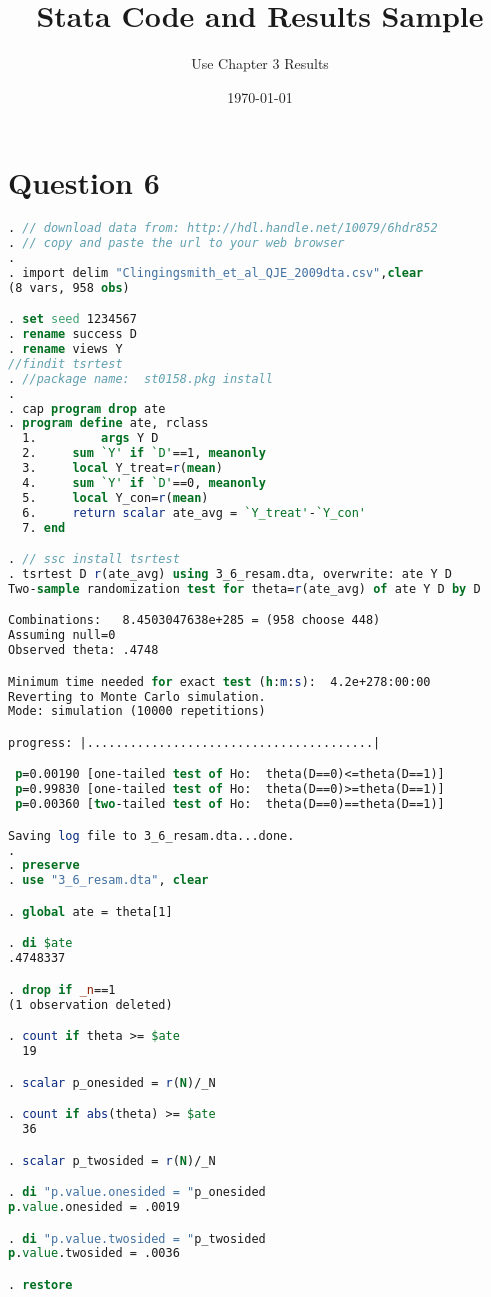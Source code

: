 \documentclass[a4paper]{article}
\begin{document}
\title{Stata Code and Results Sample}
\author{Use Chapter 3 Results }
\date{\today}
\maketitle



\section*{Question 6}
\begin{lstlisting}[language=stata]
. // download data from: http://hdl.handle.net/10079/6hdr852
. // copy and paste the url to your web browser
. 
. import delim "Clingingsmith_et_al_QJE_2009dta.csv",clear
(8 vars, 958 obs)

. set seed 1234567
. rename success D
. rename views Y
//findit tsrtest
. //package name:  st0158.pkg install
. 
. cap program drop ate
. program define ate, rclass
  1.         args Y D
  2.     sum `Y' if `D'==1, meanonly
  3.     local Y_treat=r(mean)
  4.     sum `Y' if `D'==0, meanonly
  5.     local Y_con=r(mean)
  6.     return scalar ate_avg = `Y_treat'-`Y_con'
  7. end

. // ssc install tsrtest
. tsrtest D r(ate_avg) using 3_6_resam.dta, overwrite: ate Y D
Two-sample randomization test for theta=r(ate_avg) of ate Y D by D

Combinations:   8.4503047638e+285 = (958 choose 448)
Assuming null=0
Observed theta: .4748

Minimum time needed for exact test (h:m:s):  4.2e+278:00:00
Reverting to Monte Carlo simulation.
Mode: simulation (10000 repetitions)

progress: |........................................|

 p=0.00190 [one-tailed test of Ho:  theta(D==0)<=theta(D==1)]
 p=0.99830 [one-tailed test of Ho:  theta(D==0)>=theta(D==1)]
 p=0.00360 [two-tailed test of Ho:  theta(D==0)==theta(D==1)]

Saving log file to 3_6_resam.dta...done.
.   
. preserve 
. use "3_6_resam.dta", clear

. global ate = theta[1]

. di $ate
.4748337

. drop if _n==1
(1 observation deleted)

. count if theta >= $ate
  19

. scalar p_onesided = r(N)/_N

. count if abs(theta) >= $ate
  36

. scalar p_twosided = r(N)/_N

. di "p.value.onesided = "p_onesided
p.value.onesided = .0019

. di "p.value.twosided = "p_twosided 
p.value.twosided = .0036

. restore
\end{lstlisting}
\end{document}
